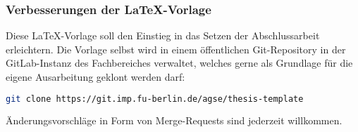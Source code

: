 \subsubsection{Verbesserungen der \LaTeX-Vorlage}

Diese \LaTeX-Vorlage soll den Einstieg in das Setzen der Abschlussarbeit
erleichtern.
Die Vorlage selbst wird in einem öffentlichen Git-Repository in der
GitLab-Instanz des Fachbereiches verwaltet, welches gerne als Grundlage für die
eigene Ausarbeitung geklont werden darf:
\begin{lstlisting}[language=bash]
git clone https://git.imp.fu-berlin.de/agse/thesis-template
\end{lstlisting}
Änderungsvorschläge in Form von Merge-Requests sind jederzeit willkommen.
